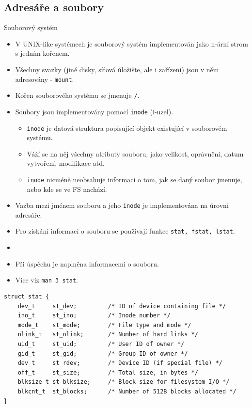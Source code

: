 \documentclass[handout]{beamer}
\begin{document}
\subsection{Adresáře a soubory}
\begin{frame}{Souborový systém}
    \begin{itemize}
        \item V UNIX-like systémech je souborový systém implementován jako n-ární strom s jedním kořenem.
        \item Všechny svazky (jiné disky, síťová úložište, ale i zařízení) jsou v něm adresovány - \texttt{mount}.
        \item Kořen souborového systému se jmenuje \texttt{/}.
        \item Soubory jsou implementovány pomocí \texttt{inode} (i-uzel).
        \begin{itemize}
            \item \texttt{inode} je datová struktura popisující objekt existující v souborovém systému.
                \item Váží se na něj všechny atributy souboru, jako velikost, oprávnění, datum vytvoření, modifikace atd.
                \item \texttt{inode} nicméně neobsahuje informaci o tom, jak se daný soubor jmenuje, nebo kde se ve FS nachází.
            \end{itemize}
        \item Vazba mezi jménem souboru a jeho \texttt{inode} je implementována na úrovni adresáře.
                \item Pro získání informací o souboru se používají funkce \texttt{stat, fstat, lstat}.
                \item {}
                \item Při úspěchu je  naplněna informacemi o souboru.
                \item Více viz \texttt{man 3 stat}.
    \end{itemize}
\begin{verbatim}
struct stat {
    dev_t     st_dev;         /* ID of device containing file */
    ino_t     st_ino;         /* Inode number */
    mode_t    st_mode;        /* File type and mode */
    nlink_t   st_nlink;       /* Number of hard links */
    uid_t     st_uid;         /* User ID of owner */
    gid_t     st_gid;         /* Group ID of owner */
    dev_t     st_rdev;        /* Device ID (if special file) */
    off_t     st_size;        /* Total size, in bytes */
    blksize_t st_blksize;     /* Block size for filesystem I/O */
    blkcnt_t  st_blocks;      /* Number of 512B blocks allocated */
}
\end{verbatim}
\end{frame}
\end{document}
